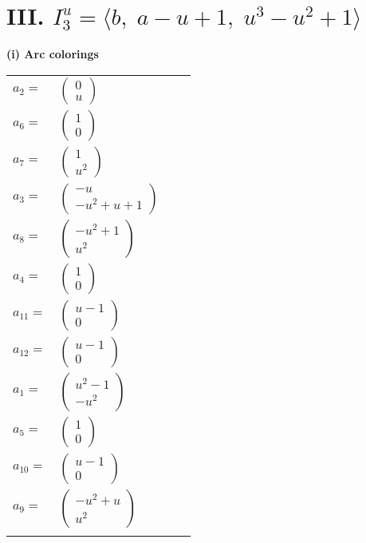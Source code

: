 \documentclass[1p]{elsarticle_modified}
\theoremstyle{definition}
\begin{document}
\centering \section*{III. $I^u_{3}= \langle b,\;a- u+1,\;u^3- u^2+1 \rangle$}
\flushleft \textbf{(i) Arc colorings}\\
\begin{tabular}{m{7pt} m{180pt} m{7pt} m{180pt} }
\flushright $a_{2}=$&$\begin{pmatrix}0\\u\end{pmatrix}$ \\
\flushright $a_{6}=$&$\begin{pmatrix}1\\0\end{pmatrix}$ \\
\flushright $a_{7}=$&$\begin{pmatrix}1\\u^2\end{pmatrix}$ \\
\flushright $a_{3}=$&$\begin{pmatrix}- u\\- u^2+u+1\end{pmatrix}$ \\
\flushright $a_{8}=$&$\begin{pmatrix}- u^2+1\\u^2\end{pmatrix}$ \\
\flushright $a_{4}=$&$\begin{pmatrix}1\\0\end{pmatrix}$ \\
\flushright $a_{11}=$&$\begin{pmatrix}u-1\\0\end{pmatrix}$ \\
\flushright $a_{12}=$&$\begin{pmatrix}u-1\\0\end{pmatrix}$ \\
\flushright $a_{1}=$&$\begin{pmatrix}u^2-1\\- u^2\end{pmatrix}$ \\
\flushright $a_{5}=$&$\begin{pmatrix}1\\0\end{pmatrix}$ \\
\flushright $a_{10}=$&$\begin{pmatrix}u-1\\0\end{pmatrix}$ \\
\flushright $a_{9}=$&$\begin{pmatrix}- u^2+u\\u^2\end{pmatrix}$\\&\end{tabular}
\end{document}
